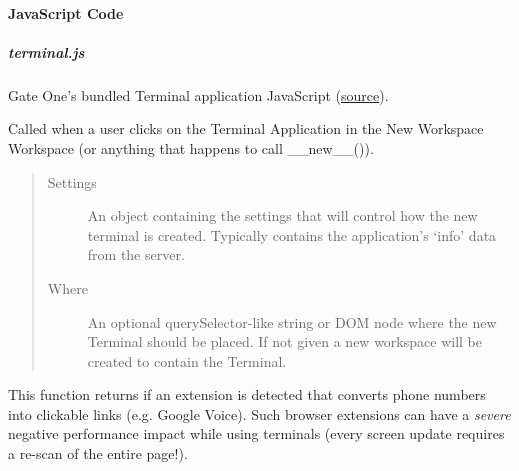 \documentclass[letterpaper,10pt,openany]{sphinxmanual}
\begin{document}
\paragraph{JavaScript Code}
\label{Applications/terminal/developer:javascript-code}

\subparagraph{terminal.js}
\label{Applications/terminal/js_terminal:terminal-javascript}\label{Applications/terminal/js_terminal::doc}\label{Applications/terminal/js_terminal:terminal-js}
Gate One's bundled Terminal application JavaScript (\href{https://github.com/liftoff/GateOne/blob/master/gateone/applications/terminal/static/terminal.js}{source}).

\begin{fulllineitems}
\label{Applications/terminal/js_terminal:GateOne.Terminal.__new__}
Called when a user clicks on the Terminal Application in the New Workspace Workspace (or anything that happens to call \_\_new\_\_()).
\begin{quote}\begin{description}
\item[{Settings}] \leavevmode
An object containing the settings that will control how the new terminal is created.  Typically contains the application's `info' data from the server.

\item[{Where}] \leavevmode
An optional querySelector-like string or DOM node where the new Terminal should be placed.  If not given a new workspace will be created to contain the Terminal.

\end{description}\end{quote}

\end{fulllineitems}


\begin{fulllineitems}
\label{Applications/terminal/js_terminal:GateOne.Terminal.hasVoiceExt}
This function returns  if an extension is detected that converts phone numbers into clickable links (e.g. Google Voice).  Such browser extensions can have a \emph{severe} negative performance impact while using terminals (every screen update requires a re-scan of the entire page!).

\end{fulllineitems}
\end{document}
